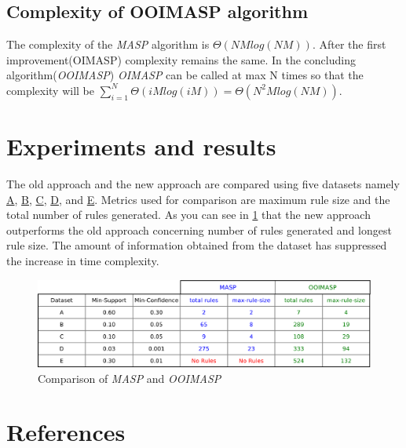 \documentclass[review]{elsarticle}
\begin{document}
\subsection{Complexity of OOIMASP algorithm}
The complexity of the \emph{MASP} algorithm \cite{oldmasp} is $ \Theta(NMlog(NM)) $. After the first improvement(OIMASP) complexity remains the same. In the concluding algorithm(\emph{OOIMASP}) \emph{OIMASP} can be called at max N times so that the complexity will be $ \displaystyle\sum_{i=1}^{N} \Theta(iMlog(iM)) = \Theta(N^{2}Mlog(NM)) $.

\section{Experiments and results}
The old approach and the new approach are compared using five datasets namely \href{https://github.com/cryptomanic/MOIMASP-datasets/blob/master/A.csv}{A}, \href{https://github.com/cryptomanic/MOIMASP-datasets/blob/master/B.csv}{B}, \href{https://github.com/cryptomanic/MOIMASP-datasets/blob/master/C.csv}{C}, \href{https://github.com/cryptomanic/MOIMASP-datasets/blob/master/D.csv}{D}, and \href{https://github.com/cryptomanic/MOIMASP-datasets/blob/master/E.csv}{E}. Metrics used for comparison are maximum rule size and the total number of rules generated. As you can see in \ref{Fig 11} that the new approach outperforms the old approach concerning number of rules generated and longest rule size. The amount of information obtained from the dataset has suppressed the increase in time complexity.

\begin{figure}
\begin{center}
\includegraphics[scale=0.30]{pdf/comparison}
\end{center}
\caption{Comparison of \emph{MASP} and \emph{OOIMASP}}
\label{Fig 11}
\end{figure}

\section*{References}


\end{document}
